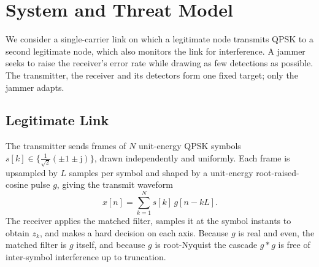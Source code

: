 \section{System and Threat Model}\label{sec:system}
We consider a single-carrier link on which a legitimate node transmits QPSK to a second legitimate node, which also monitors the link for interference.
A jammer seeks to raise the receiver's error rate while drawing as few detections as possible.
The transmitter, the receiver and its detectors form one fixed target; only the jammer adapts.

\subsection{Legitimate Link}\label{sec:link}
The transmitter sends frames of $N$ unit-energy QPSK symbols $s[k]\in\{\tfrac{1}{\sqrt2}(\pm1\pm\mathrm{j})\}$, drawn independently and uniformly.
Each frame is upsampled by $L$ samples per symbol and shaped by a unit-energy root-raised-cosine pulse $g$, giving the transmit waveform
\begin{equation}
x[n]=\sum_{k=1}^{N} s[k]\,g[n-kL].
\label{eq:tx}
\end{equation}
The receiver applies the matched filter, samples it at the symbol instants to obtain $z_k$, and makes a hard decision on each axis.
Because $g$ is real and even, the matched filter is $g$ itself, and because $g$ is root-Nyquist the cascade $g*g$ is free of inter-symbol interference up to truncation.

